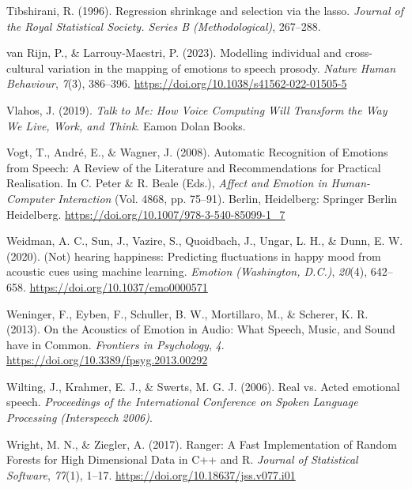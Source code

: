 \documentclass[
  english,
  man,floatsintext]{apa6}
\newlength{\cslhangindent}
\newenvironment{CSLReferences}[2] %
 {%
  \setlength{\parindent}{0pt}
  \ifodd #1 \everypar{\setlength{\hangindent}{\cslhangindent}}\ignorespaces\fi
  \ifnum #2 > 0
  \setlength{\parskip}{#2\baselineskip}
  \fi
 }%
 {}
\begin{document}
\begin{CSLReferences}{1}{0}
\leavevmode{}%
Tibshirani, R. (1996). Regression shrinkage and selection via the lasso. \emph{Journal of the Royal Statistical Society. Series B (Methodological)}, 267--288.

\leavevmode{}%
van Rijn, P., \& Larrouy-Maestri, P. (2023). Modelling individual and cross-cultural variation in the mapping of emotions to speech prosody. \emph{Nature Human Behaviour}, \emph{7}(3), 386--396. \url{https://doi.org/10.1038/s41562-022-01505-5}

\leavevmode{}%
Vlahos, J. (2019). \emph{Talk to {Me}: {How Voice Computing Will Transform} the {Way We Live}, {Work}, and {Think}}. Eamon Dolan Books.

\leavevmode{}%
Vogt, T., André, E., \& Wagner, J. (2008). Automatic {Recognition} of {Emotions} from {Speech}: {A Review} of the {Literature} and {Recommendations} for {Practical Realisation}. In C. Peter \& R. Beale (Eds.), \emph{Affect and {Emotion} in {Human-Computer Interaction}} (Vol. 4868, pp. 75--91). Berlin, Heidelberg: Springer Berlin Heidelberg. \url{https://doi.org/10.1007/978-3-540-85099-1_7}

\leavevmode{}%
Weidman, A. C., Sun, J., Vazire, S., Quoidbach, J., Ungar, L. H., \& Dunn, E. W. (2020). ({Not}) hearing happiness: {Predicting} fluctuations in happy mood from acoustic cues using machine learning. \emph{Emotion (Washington, D.C.)}, \emph{20}(4), 642--658. \url{https://doi.org/10.1037/emo0000571}

\leavevmode{}%
Weninger, F., Eyben, F., Schuller, B. W., Mortillaro, M., \& Scherer, K. R. (2013). On the {Acoustics} of {Emotion} in {Audio}: {What Speech}, {Music}, and {Sound} have in {Common}. \emph{Frontiers in Psychology}, \emph{4}. \url{https://doi.org/10.3389/fpsyg.2013.00292}

\leavevmode{}%
Wilting, J., Krahmer, E. J., \& Swerts, M. G. J. (2006). Real vs. Acted emotional speech. \emph{Proceedings of the International Conference on Spoken Language Processing (Interspeech 2006)}.

\leavevmode{}%
Wright, M. N., \& Ziegler, A. (2017). Ranger: {A Fast Implementation} of {Random Forests} for {High Dimensional Data} in {C}++ and {R}. \emph{Journal of Statistical Software}, \emph{77}(1), 1--17. \url{https://doi.org/10.18637/jss.v077.i01}


\end{CSLReferences}
\end{document}
